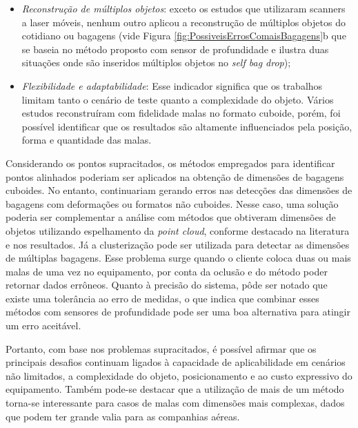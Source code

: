     \begin{itemize}
        \item \textit{Reconstrução de múltiplos objetos}: exceto os estudos que utilizaram scanners a laser móveis, nenhum outro aplicou a reconstrução de múltiplos objetos do cotidiano ou bagagens (vide Figura \ref{fig:PossiveisErrosComaisBagagens}b que se baseia no método proposto com sensor de profundidade e ilustra duas situações onde são inseridos múltiplos objetos no \textit{self bag drop}); 
        \item \textit{Flexibilidade e adaptabilidade}: Esse indicador significa que os trabalhos limitam tanto o cenário de teste quanto a complexidade do objeto. Vários estudos reconstruíram com fidelidade malas no formato cuboide, porém, foi possível identificar que os resultados são altamente influenciados pela posição, forma e quantidade das malas.
    \end{itemize}

    Considerando os pontos supracitados, os métodos empregados para identificar pontos alinhados poderiam ser aplicados na obtenção de dimensões de bagagens cuboides. No entanto, continuariam gerando erros nas detecções das dimensões de bagagens com deformações ou formatos não cuboides. Nesse caso, uma solução poderia ser complementar a análise com métodos que obtiveram dimensões de objetos utilizando espelhamento da \textit{point cloud}, conforme destacado na literatura e nos resultados. Já a clusterização pode ser utilizada para detectar as dimensões de múltiplas bagagens. Esse problema surge quando o cliente coloca duas ou mais malas de uma vez no equipamento, por conta da oclusão e do método poder retornar dados errôneos. Quanto à precisão do sistema, pôde ser notado que existe uma tolerância ao erro de medidas, o que indica que combinar esses métodos com sensores de profundidade pode ser uma boa alternativa para atingir um erro aceitável.
    
    Portanto, com base nos problemas supracitados, é possível afirmar que os principais desafios continuam ligados à capacidade de aplicabilidade em cenários não limitados, a complexidade do objeto, posicionamento e ao custo expressivo do equipamento. Também pode-se destacar que a utilização de mais de um método torna-se interessante para casos de malas com dimensões mais complexas, dados que podem ter grande valia para as companhias aéreas.

